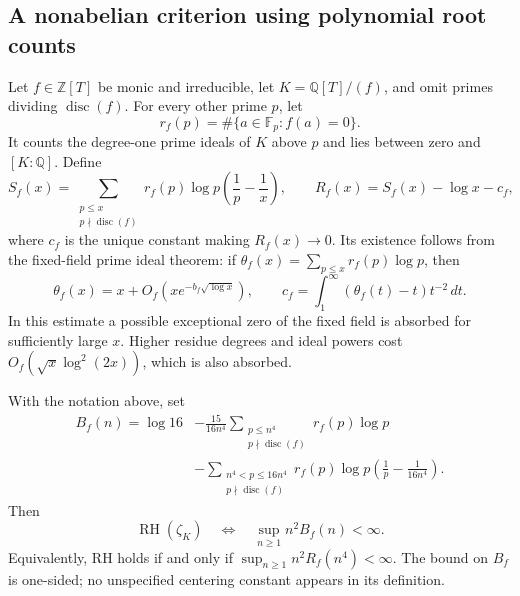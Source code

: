 \subsection{A nonabelian criterion using polynomial root counts}

Let $f\in\mathbb Z[T]$ be monic and irreducible, let
$K=\mathbb Q[T]/(f)$, and omit primes dividing $\operatorname{disc}(f)$.
For every other prime $p$, let
\[
 r_f(p)=\#\{a\in\mathbb F_p:f(a)=0\}.
\]
It counts the degree-one prime ideals of $K$ above $p$ and lies between
zero and $[K:\mathbb Q]$. Define
\[
 S_f(x)=\sum_{\substack{p\le x\\p\nmid\operatorname{disc}(f)}}
       r_f(p)\log p\left(\frac1p-\frac1x\right),
 \qquad R_f(x)=S_f(x)-\log x-c_f,
\]
where $c_f$ is the unique constant making $R_f(x)\to0$.
Its existence follows from the fixed-field prime ideal theorem:
if $\theta_f(x)=\sum_{p\le x}r_f(p)\log p$, then
\[
 \theta_f(x)=x+O_f(xe^{-b_f\sqrt{\log x}}),
 \qquad
 c_f=\int_1^\infty(\theta_f(t)-t)t^{-2}\,dt.
\]
In this estimate a possible exceptional zero of the fixed field is
absorbed for sufficiently large $x$. Higher residue degrees and ideal
powers cost $O_f(\sqrt x\log^2(2x))$, which is also absorbed.

\begin{theorem}
\label{thm:sampling-numberfield}
With the notation above, set
\begin{align}
 B_f(n)=\log16
 &-\frac{15}{16n^4}
       \sum_{\substack{p\le n^4\\p\nmid\operatorname{disc}(f)}}r_f(p)\log p
 \nonumber\\[-2pt]
 &-\sum_{\substack{n^4<p\le16n^4\\p\nmid\operatorname{disc}(f)}}
       r_f(p)\log p\left(\frac1p-\frac1{16n^4}\right).
 \label{eq:sampling-polynomial-statistic}
\end{align}
Then
\[
 \operatorname{RH}(\zeta_K)
 \quad\Longleftrightarrow\quad
 \sup_{n\ge1}n^2B_f(n)<\infty.
\]
Equivalently, RH holds if and only if
$\sup_{n\ge1}n^2R_f(n^4)<\infty$.
The bound on $B_f$ is one-sided; no unspecified centering constant
appears in its definition.
\end{theorem}

